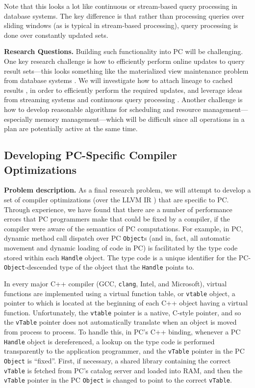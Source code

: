 Note that this looks a lot like continuous or stream-based query processing in database systems.  The key difference is that rather
than processing queries over sliding windows (as is typical in stream-based processing), query processing is done over constantly
updated sets.

\vspace{5 pt}
\noindent
\textbf{Research Questions.}  Building such functionality into PC will be challenging.
One key research challenge is how to efficiently perform online updates to query result sets---this looks
something like the materialized view maintenance problem from database systems \cite{gupta1995maintenance, agrawal1997efficient}.  We will investigate how to attach lineage 
to cached results \cite{buneman2007provenance, widom2004trio}, in order to efficiently perform the required updates, and
leverage ideas from streaming systems \cite{zaharia2013discretized, babcock2002models}  and continuous query processing \cite{chandrasekaran2003telegraphcq, chen2000niagaracq}.
Another challenge is how to develop reasonable algorithms
for scheduling and
resource management---especially memory management---which
will be difficult since all operations in a plan are potentially active at the same time.  

\subsection{Developing PC-Specific Compiler Optimizations}

\noindent
\textbf{Problem description.}
As a final research problem, we will attempt to develop a set of compiler optimizations 
(over the LLVM IR \cite{lattner2004llvm}) that are
specific to PC.  Through experience, we have found that there 
are a number of performance errors that PC programmers make that could be fixed by a compiler, if the compiler were
aware of the semantics of PC computations.  For example,
in PC, dynamic method call dispatch over PC \texttt{Object}s (and in, fact, all automatic movement and dynamic loading 
of code in PC)
is facilitated by the type code stored within each
\texttt{Handle} object.
The
type code is a unique identifier for the PC-\texttt{Object}-descended type of the object that the \texttt{Handle} points to.

In every major C++ compiler (GCC, \texttt{clang}, Intel, and Microsoft), virtual functions
are implemented using a virtual function table, or \texttt{vtable} object, a pointer to which is located at the beginning
of each C++ object having a virtual function.  Unfortunately, the \texttt{vtable} pointer is a native, C-style pointer, and so the
\texttt{vTable} pointer does not automatically translate when an
object is moved from process to process.  To handle this, in
PC's C++ binding, whenever a PC \texttt{Handle} object is dereferenced,
a lookup on the
type code is performed transparently to the application programmer, and the \texttt{vTable} pointer in the PC \texttt{Object} is ``fixed''.
First, if necessary, a shared library containing 
the correct \texttt{vTable} is fetched from PC's catalog server and loaded into RAM, and then the  \texttt{vTable} pointer
in the PC \texttt{Object} is changed to point to the correct \texttt{vTable}.


